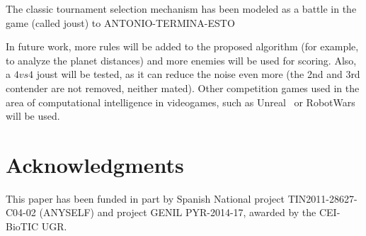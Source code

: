 \documentclass[conference]{IEEEtran}
\begin{document}
The classic tournament selection mechanism has been modeled as a battle in the game (called joust) to ANTONIO-TERMINA-ESTO

In future work, more rules will be added to the proposed algorithm (for example, to analyze the planet distances) and more enemies will be used for scoring. Also, a $4vs4$ joust will be tested, as it can reduce the noise even more (the 2nd and 3rd contender are not removed, neither mated). Other competition games used in the area of computational intelligence in videogames, such as Unreal\texttrademark~ or RobotWars\texttrademark~ will be used.





\section{Acknowledgments}
This paper has been funded in part by Spanish National project TIN2011-28627-C04-02 (ANYSELF) and project GENIL PYR-2014-17, awarded by the CEI-BioTIC UGR.



\end{document}
